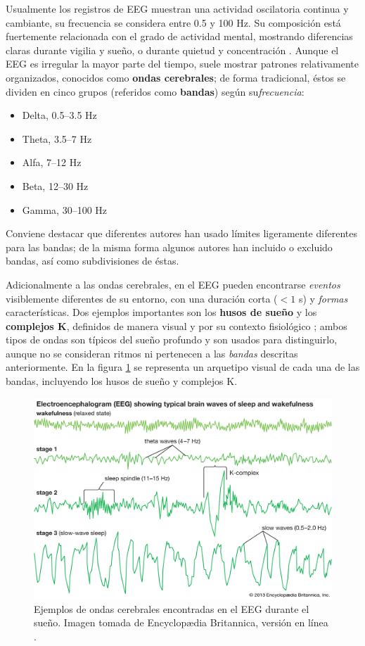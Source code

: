 \documentclass[12pt,letterpaper]{book}
\newcommand{\hz}{\si{\hertz}\xspace}
\begin{document}
Usualmente los registros de EEG muestran una actividad oscilatoria continua y cambiante, su frecuencia se considera entre 0.5 y 100 \hz. 
%
Su composición está fuertemente relacionada con el grado de actividad mental, mostrando diferencias claras durante vigilia y sueño, o durante quietud y concentración \cite{Clark98_2}.
%
Aunque el EEG es irregular la mayor parte del tiempo, suele mostrar patrones relativamente 
organizados, conocidos como \textbf{ondas cerebrales}; de forma tradicional, éstos se dividen en cinco grupos (referidos como \textbf{bandas}) según su\textit{frecuencia}:
\begin{itemize}
\item Delta, 0.5--3.5 \hz
\item Theta, 3.5--7 \hz
\item Alfa, 7--12 \hz
\item Beta, 12--30 \hz
\item Gamma, 30--100 \hz
\end{itemize}

Conviene destacar que diferentes autores han usado límites ligeramente diferentes para las bandas; de la misma forma algunos autores han incluido o excluido bandas, así como subdivisiones de éstas.

Adicionalmente a las ondas cerebrales, en el EEG pueden encontrarse \textit{eventos} visiblemente diferentes de su entorno, con%
%
una duración corta ($<1$ s) y \textit{formas} características.
%
Dos ejemplos importantes son los \textbf{husos de sueño} y los \textbf{complejos K}, definidos de manera visual y por su contexto fisiológico \cite{AASM07}; ambos tipos de ondas son típicos del sueño profundo y son usados para distinguirlo, aunque no se consideran ritmos ni pertenecen a las \textit{bandas} descritas anteriormente.
%
En la figura \ref{ritmos} se representa un arquetipo visual de cada una de las bandas, incluyendo los husos de sueño y complejos K.

\begin{figure}
\centering
\includegraphics[width=0.95\linewidth]{./img_diagramas/ondas_britannica.jpg} 
\caption[Ejemplos de ondas cerebrales encontradas en el EEG]
{Ejemplos de ondas cerebrales encontradas en el EEG durante el sueño. Imagen tomada de Encyclop{\ae}dia Britannica, 
versión en línea \cite{Britannica}.}
\label{ritmos}
\end{figure}
\end{document}
